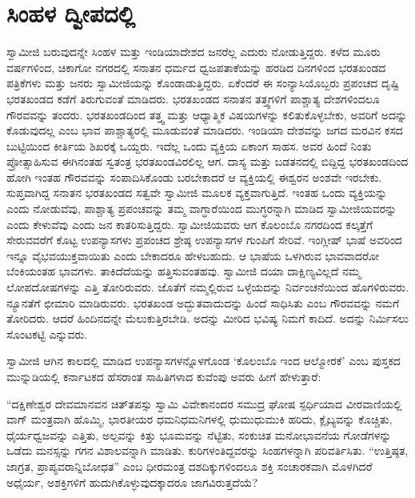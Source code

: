
\chapter{ಸಿಂಹಳ ದ್ವೀಪದಲ್ಲಿ}

 ಸ್ವಾಮೀಜಿ ಬರುವುದನ್ನೇ ಸಿಂಹಳ ಮತ್ತು ಇಂಡಿಯಾದೇಶದ ಜನರೆಲ್ಲ ಎದುರು ನೋಡುತ್ತಿದ್ದರು. ಕಳೆದ ಮೂರು ವರ್ಷಗಳಿಂದ, ಚಿಕಾಗೋ ನಗರದಲ್ಲಿ ಸನಾತನ ಧರ್ಮದ ಧ್ವಜಪತಾಕೆಯನ್ನು ಹರಡಿದ ದಿನಗಳಿಂದ ಭರತಖಂಡದ ಪತ್ರಿಕೆಗಳು ಮತ್ತು ಜನರು ಸ್ವಾಮೀಜಿಯನ್ನು ಕೊಂಡಾಡುತ್ತಿದ್ದರು. ಏಕೆಂದರೆ ಈ ಸಂನ್ಯಾಸಿಯೊಬ್ಬರು ಪ್ರಪಂಚದ ದೃಷ್ಟಿ ಭರತಖಂಡದ ಕಡೆಗೆ ತಿರುಗುವಂತೆ ಮಾಡಿದರು. ಭರತಖಂಡದ ಸನಾತನ ತತ್ತ್ವಗಳಿಗೆ ಪಾಶ್ಚಾತ್ಯ ದೇಶಗಳಿಂದಲೂ ಗೌರವವನ್ನು ತಂದರು. ಭರತಖಂಡದಿಂದ ತತ್ತ್ವ ಮತ್ತು ಆಧ್ಯಾತ್ಮಿಕ ವಿಷಯಗಳನ್ನು ಕಲಿತುಕೊಳ್ಳಬೇಕು, ಅವರಿಗೆ ಅದನ್ನು ಕೊಡುವುದಲ್ಲ ಎಂಬ ಭಾವ ಪಾಶ್ಚಾತ್ಯರಲ್ಲಿ ಮೂಡುವಂತೆ ಮಾಡಿದರು. ಇಂಡಿಯಾ ದೇಶವನ್ನು ಜಗದ ಮರವಿನ ಕಸದ ಬುಟ್ಟಿಯಿಂದ ಕೀರ್ತಿಯ ಶಿಖರಕ್ಕೆ ಒಯ್ದರು. ಇದೆಲ್ಲ ಒಂದು ವ್ಯಕ್ತಿಯ ಏಕಾಂಗ ಸಾಹಸ. ಅವರ ಹಿಂದೆ ನಿಂತು ಪ್ರೋತ್ಸಾಹಿಸುವ ಈಗಿನಂತಹ ಸ್ವತಂತ್ರ ಭರತಖಂಡವಿರಲಿಲ್ಲ ಆಗ. ದಾಸ್ಯ ಮತ್ತು ಬಡತನದಲ್ಲಿ ಬಿದ್ದಿದ್ದ ಭರತಖಂಡದಿಂದ ಹೋಗಿ ಇಂತಹ ಗೌರವವನ್ನು ಸಂಪಾದಿಸಿಕೊಂಡು ಬರಬೇಕಾದರೆ ಆ ವ್ಯಕ್ತಿಯಲ್ಲಿ ಈಶ್ವರನ ಅಂಶವೇ ಇರಬೇಕು. ಸುಪ್ತವಾಗಿದ್ದ ಸನಾತನ ಭರತಖಂಡದ ಸತ್ವವೇ ಸ್ವಾಮೀಜಿ ಮೂಲಕ ವ್ಯಕ್ತವಾಗುತ್ತಿದೆ. ಇಂತಹ ಒಂದು ವ್ಯಕ್ತಿಯನ್ನು ಎಂದು ನೋಡುವೆವು, ಪಾಶ್ಚಾತ್ಯ ಪ್ರಪಂಚವನ್ನು ತಮ್ಮ ವಾಗ್ಧಾರೆಯಿಂದ ಮುಗ್ಧರನ್ನಾಗಿ ಮಾಡಿದ ಸ್ವಾಮೀಜಿಯವರನ್ನು ಎಂದು ಕೇಳುವೆವು ಎಂದು ಜನ ಕಾತರಿಸುತ್ತಿದ್ದರು. ಸ್ವಾಮೀಜಿಯವರು ಆಗ ಕೊಲಂಬೊ ನಗರದಿಂದ ಕಲ್ಕತ್ತೆಗೆ ಸೇರುವವರೆಗೆ ಕೊಟ್ಟ ಉಪನ್ಯಾಸಗಳು ಪ್ರಪಂಚದ ಶ್ರೇಷ್ಠ ಉಪನ್ಯಾಸಗಳ ಗುಂಪಿಗೆ ಸೇರಿವೆ. ಇಂಗ್ಲೀಷ್ ಭಾಷೆ ಅವರಿಂದ ಇನ್ನೂ ವೈಭವಯುಕ್ತವಾಯಿತು ಎಂದು ಬೇಕಾದರೂ ಹೇಳಬಹುದು. ಆ ಭಾಷೆಯ ಒಳಗಿರುವ ಭಾವವಾದರೋ‌ ಬೆಂಕಿಯಂತಹ ಭಾವಗಳು. ತಾಕಿದೆದೆಯನ್ನು ಹತ್ತಿಸುವಂತಹವು. ಸ್ವಾಮೀಜಿ ದಯಾ ದಾಕ್ಷಿಣ್ಯವಿಲ್ಲದೆ ನಮ್ಮ ಲೋಪದೋಷಗಳನ್ನು ಎತ್ತಿ ತೋರಿರುವರು. ಜೊತೆಗೆ ನಮ್ಮಲ್ಲಿರುವ ಒಳ್ಳೆಯದನ್ನು ನಿರ್ವಂಚನೆಯಿಂದ ಹೊಗಳಿರುವರು. ನ್ಯೂನತೆಗೆ ಛೀಮಾರಿ ಮಾಡಿರುವರು. ಭರತಖಂಡ ಅದ್ಭುತವಾದುದನ್ನು ಹಿಂದೆ ಸಾಧಿಸಿತು ಎಂಬ ಗೌರವವನ್ನು ನಮಗೆ ತೋರಿದರು. ಆದರೆ ಹಿಂದಿನದನ್ನೇ ಮೆಲುಕುತ್ತಿರಬೇಡಿ. ಅದನ್ನು ಮೀರಿದ ಭವಿಷ್ಯ ನಿಮಗೆ ಕಾದಿದೆ. ಅದನ್ನು ನಿರ್ಮಿಸಲು ಸೊಂಟಕಟ್ಟಿ ಎನ್ನುವರು. 

 ಸ್ವಾಮೀಜಿ ಆಗಿನ ಕಾಲದಲ್ಲಿ ಮಾಡಿದ ಉಪನ್ಯಾಸಗಳನ್ನೊಳಗೊಂಡ ‘ಕೊಲಂಬೊ ಇಂದ ಆಲ್ಮೋರಕೆ’ ಎಂಬ ಪುಸ್ತಕದ ಮುನ್ನುಡಿಯಲ್ಲಿ ಕರ್ನಾಟಕದ ಹೆಸರಾಂತ ಸಾಹಿತಿಗಳಾದ ಕುವೆಂಪು ಅವರು ಹೀಗೆ ಹೇಳುತ್ತಾರೆ: 

 “ದಕ್ಷಿಣೇಶ್ವರ ದೇವಮಾನವನ ಚಿತ್​ತಪಸ್ಸು ಸ್ವಾಮಿ ವಿವೇಕಾನಂದರ ಸಮುದ್ರ ಘೋಷ ಸ್ಪರ್ಧಿಯಾದ ವೀರವಾಣಿಯಲ್ಲಿ ವಾಗ್ ಮಂತ್ರವಾಗಿ ಹೊಮ್ಮಿ, ಭಾರತೀಯರ ಧಮನಿಧಮನಿಗಳಲ್ಲಿ ಧುಮುಧುಮುಕಿ ಹರಿದು, ಕ್ಲೈಬ್ಯವನ್ನು ಕೊಚ್ಚಿತು, ಧೈರ್ಯಧ್ವಜವನ್ನು ಎತ್ತಿತು, ಅಲ್ಪವನ್ನು ಕಿತ್ತು ಭೂಮವನ್ನು ನೆಟ್ಟಿತು, ಸಂಕುಚಿತ ಮನೋಭಾವನೆಯ ಗೋಡೆಗಳನ್ನು ಒಡೆದು ಮನಸ್ಸನ್ನು ಗಗನ ವಿಶಾಲವನ್ನಾಗಿ ಮಾಡಿತು. ಕುರಿಗಳಂತಿದ್ದವರನ್ನು ಸಿಂಹಗಳನ್ನಾಗಿ ಪರಿವರ್ತಿಸಿತು. “ಉತ್ತಿಷ್ಠತ, ಜಾಗ್ರತ, ಪ್ರಾಪ್ಯವರಾನ್ನಿಬೋಧತ” ಎಂಬ ಧೀರಮಂತ್ರ ದಶದಿಕ್ಕುಗಳಿಂದಲೂ ಶಕ್ತಿ ಸಂಚಾರಕವಾಗಿ ಮೊಳಗಿದರೆ ಅಧೈರ್ಯ, ಅಶಕ್ತಿಗಳಿಗೆ ಹುದುಗಿಕೊಳ್ಳುವುದಕ್ಕಾದರೂ ಜಾಗವಿರುತ್ತದೆಯೆ? 

